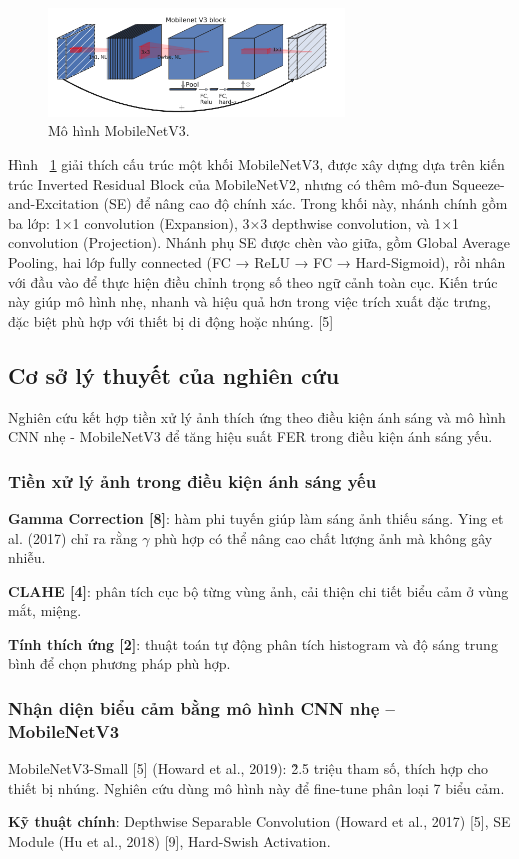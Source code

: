 \begin{figure}[H]
    \centering
    \includegraphics[width=0.7\textwidth]{img/mobinetv3.png} %
    \caption{Mô hình MobileNetV3.}
    \label{fig:emotion_distribution11}
\end{figure}

Hình ~\ref{fig:emotion_distribution11} giải thích cấu trúc một khối MobileNetV3, được xây dựng dựa trên kiến trúc Inverted Residual Block của MobileNetV2, nhưng có thêm mô-đun Squeeze-and-Excitation (SE) để nâng cao độ chính xác. Trong khối này, nhánh chính gồm ba lớp: 1×1 convolution (Expansion), 3×3 depthwise convolution, và 1×1 convolution (Projection). Nhánh phụ SE được chèn vào giữa, gồm Global Average Pooling, hai lớp fully connected (FC → ReLU → FC → Hard-Sigmoid), rồi nhân với đầu vào để thực hiện điều chỉnh trọng số theo ngữ cảnh toàn cục. Kiến trúc này giúp mô hình nhẹ, nhanh và hiệu quả hơn trong việc trích xuất đặc trưng, đặc biệt phù hợp với thiết bị di động hoặc nhúng. [5]


\subsection{Cơ sở lý thuyết của nghiên cứu}
Nghiên cứu kết hợp tiền xử lý ảnh thích ứng theo điều kiện ánh sáng và mô hình CNN nhẹ - MobileNetV3 để tăng hiệu suất FER trong điều kiện ánh sáng yếu.

\subsubsection{Tiền xử lý ảnh trong điều kiện ánh sáng yếu}
\textbf{Gamma Correction [8]}: hàm phi tuyến giúp làm sáng ảnh thiếu sáng. Ying et al. (2017) chỉ ra rằng \(\gamma\) phù hợp có thể nâng cao chất lượng ảnh mà không gây nhiễu.\par
\textbf{CLAHE [4]}: phân tích cục bộ từng vùng ảnh, cải thiện chi tiết biểu cảm ở vùng mắt, miệng.\par
\textbf{Tính thích ứng [2]}: thuật toán tự động phân tích histogram và độ sáng trung bình để chọn phương pháp phù hợp.

\subsubsection{Nhận diện biểu cảm bằng mô hình CNN nhẹ – MobileNetV3}
MobileNetV3-Small [5] (Howard et al., 2019): \~2.5 triệu tham số, thích hợp cho thiết bị nhúng. Nghiên cứu dùng mô hình này để fine-tune phân loại 7 biểu cảm.\par
\textbf{Kỹ thuật chính}: Depthwise Separable Convolution (Howard et al., 2017) [5], SE Module (Hu et al., 2018) [9], Hard-Swish Activation.

